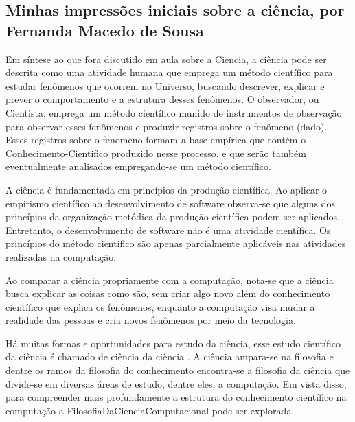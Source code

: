 \subsection{Minhas impressões iniciais sobre a ciência, por Fernanda Macedo de Sousa}

Em síntese ao que fora discutido em aula sobre a \gls{Ciencia}, a ciência pode ser descrita como uma atividade humana que emprega um método científico para estudar fenômenos que ocorrem no Universo, buscando descrever, explicar e prever o comportamento e a estrutura desses fenômenos. O observador, ou \gls{Cientista}, emprega um método científico munido de instrumentos de observação para observar esses fenômenos e produzir registros sobre o fenômeno (dado). Esses registros sobre o \gls{fenomeno} formam a base empírica que contém o \gls{Conhecimento-Cientifico} produzido nesse processo, e que serão também eventualmente analisados empregando-se um método científico. 

A ciência é fundamentada em princípios da produção científica. Ao aplicar o empirismo científico ao desenvolvimento de software observa-se que alguns dos princípios da organização metódica da produção científica podem ser aplicados. Entretanto, o desenvolvimento de software não é uma atividade científica. Os princípios do método cientifico são apenas parcialmente aplicáveis nas atividades realizadas na computação. 

Ao comparar a ciência propriamente com a computação, nota-se que a ciência busca explicar as coisas como são, sem criar algo novo além do conhecimento científico que explica os fenômenos, enquanto a computação visa mudar a realidade das pessoas e cria novos fenômenos por meio da \gls{tecnologia}.

Há muitas formas e oportunidades para estudo da ciência, esse  estudo científico da ciência é chamado de ciência da ciência \citep{clauset_data-driven_2017}. A ciência ampara-se na filosofia e dentre os ramos da filosofia do conhecimento encontra-se a filosofia da ciência que divide-se em diversas áreas de estudo, dentre eles, a computação. Em vista disso, para compreender mais profundamente a estrutura do conhecimento científico na computação a  \gls{FilosofiaDaCienciaComputacional} pode ser explorada.
